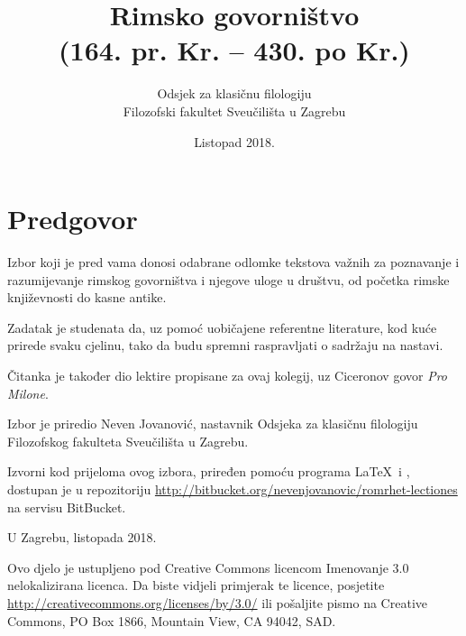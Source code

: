 \documentclass[a4paper,12pt,twoside]{report}
\newcommand{\subtitle}[1]{%
  \posttitle{%
    \par\end{center}
    \begin{center}\large#1\end{center}
    \vskip0.5em}%
}
\begin{document}
\title{Rimsko govorništvo\\(164. pr. Kr. – 430. po Kr.)}
\subtitle{Čitanka}
\author{Odsjek za klasičnu filologiju\\
Filozofski fakultet Sveučilišta u Zagrebu}
\date{Listopad 2018.}
\maketitle

\clearpage
\thispagestyle{empty}




\chapter*{Predgovor}


Izbor koji je pred vama donosi odabrane odlomke tekstova važnih za poznavanje i razumijevanje rimskog govorništva i njegove uloge u društvu, od početka rimske književnosti do kasne antike.

Zadatak je studenata da, uz pomoć uobičajene referentne literature, kod kuće prirede svaku cjelinu, tako da budu spremni raspravljati o sadržaju na nastavi.

Čitanka je također dio lektire propisane za ovaj kolegij, uz Ciceronov govor \textit{Pro Milone}.

Izbor je priredio Neven Jovanović, nastavnik Odsjeka za klasičnu filologiju Filozofskog fakulteta Sveučilišta u Zagrebu.

Izvorni kod prijeloma ovog izbora, priređen pomoću programa \LaTeX\ i \XeLaTeX, dostupan je u repozitoriju \url{http://bitbucket.org/nevenjovanovic/romrhet-lectiones} na servisu BitBucket.



\medskip

U Zagrebu, listopada 2018.

\vspace*{\fill}

\noindent Ovo djelo je ustupljeno pod Creative Commons licencom Imenovanje 3.0 nelokalizirana licenca. Da biste vidjeli primjerak te licence, posjetite \url{http://creativecommons.org/licenses/by/3.0/} ili pošaljite pismo na Creative Commons, PO Box 1866, Mountain View, CA 94042, SAD.
\end{document}
